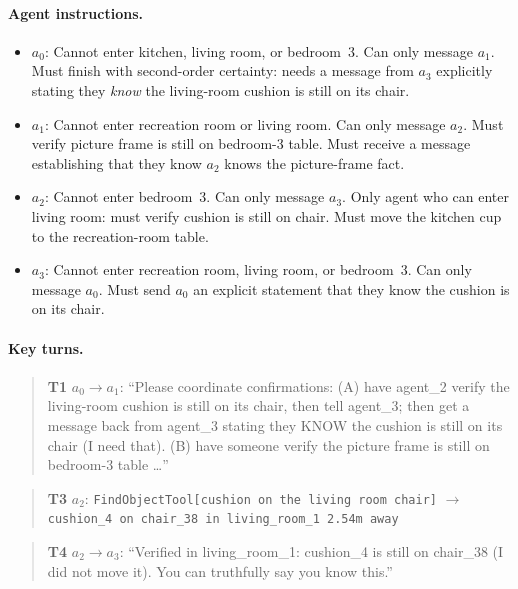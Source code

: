 \documentclass{article} %
\begin{document}
\paragraph{Agent instructions.}
\begin{itemize}
\item $a_0$: Cannot enter kitchen, living room, or bedroom~3. Can only message $a_1$. Must finish with second-order certainty: needs a message from $a_3$ explicitly stating they \emph{know} the living-room cushion is still on its chair.
\item $a_1$: Cannot enter recreation room or living room. Can only message $a_2$. Must verify picture frame is still on bedroom-3 table. Must receive a message establishing that they know $a_2$ knows the picture-frame fact.
\item $a_2$: Cannot enter bedroom~3. Can only message $a_3$. Only agent who can enter living room: must verify cushion is still on chair. Must move the kitchen cup to the recreation-room table.
\item $a_3$: Cannot enter recreation room, living room, or bedroom~3. Can only message $a_0$. Must send $a_0$ an explicit statement that they know the cushion is on its chair.
\end{itemize}

\paragraph{Key turns.}

\begin{quote}\small
\textbf{T1} $a_0 \to a_1$: ``Please coordinate confirmations: (A) have agent\_2 verify the living-room cushion is still on its chair, then tell agent\_3; then get a message back from agent\_3 stating they KNOW the cushion is still on its chair (I need that). (B) have someone verify the picture frame is still on bedroom-3 table \ldots''
\end{quote}

\begin{quote}\small
\textbf{T3} $a_2$: \texttt{FindObjectTool[cushion on the living room chair]} $\to$ \texttt{cushion\_4 on chair\_38 in living\_room\_1 2.54m away}
\end{quote}

\begin{quote}\small
\textbf{T4} $a_2 \to a_3$: ``Verified in living\_room\_1: cushion\_4 is still on chair\_38 (I did not move it). You can truthfully say you know this.''
\end{quote}
\end{document}
